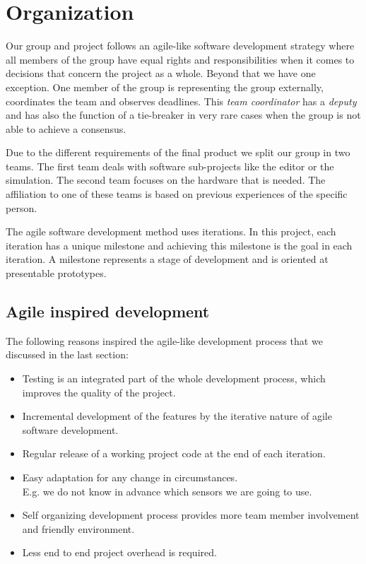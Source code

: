 \chapter{Organization}
\label{chapter:Organization}
Our group and project follows an agile-like software development strategy where all members of the group have equal rights and
responsibilities when it comes to decisions that concern the project as a whole.
Beyond that we have one exception. One member of the group is representing the group externally, coordinates the team and observes deadlines.
This \emph{team coordinator} has a \emph{deputy} and has also the function of a tie-breaker in very rare cases when the group is not able to achieve a consensus.

Due to the different requirements of the final product we split our group in two teams.
The first team deals with software sub-projects like the editor or the simulation.
The second team focuses on the hardware that is needed.
The affiliation to one of these teams is based on previous experiences of the specific person.

The agile software development method uses iterations.
In this project, each iteration has a unique milestone and achieving this milestone is the goal in each iteration.
A milestone represents a stage of development and is oriented at presentable prototypes. 

\section{Agile inspired development}
The following reasons inspired the agile-like development process that we discussed in the last section:

\begin{itemize}
\item Testing is an integrated part of the whole development process, which improves the
quality of the project.
\item Incremental development of the features by the iterative nature of agile software
development.
\item Regular release of a working project code at the end of each iteration.
\item Easy adaptation for any change in circumstances.\\
	  E.g. we do not know in advance which sensors we are going to use.
\item Self organizing development process provides more team member involvement and
friendly environment.
\item Less end to end project overhead is required.
\end{itemize}

